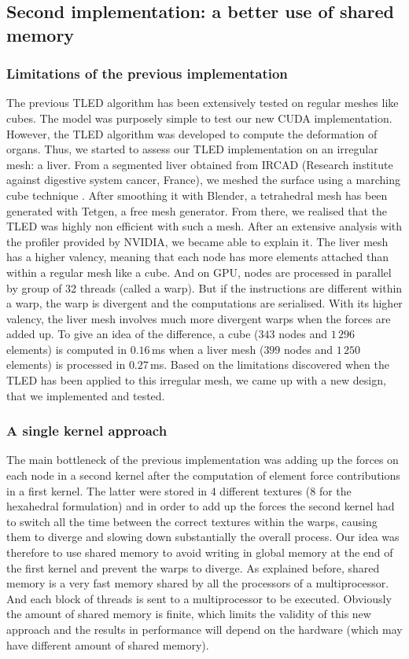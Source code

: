 	\subsection{Second implementation: a better use of shared memory}

\subsubsection*{Limitations of the previous implementation}
The previous TLED algorithm has been extensively tested on regular meshes like cubes. The model was purposely simple to test our new CUDA implementation. However, the TLED algorithm was developed to compute the deformation of organs. Thus, we started to assess our TLED implementation on an irregular mesh: a liver. From a segmented liver obtained from IRCAD (Research institute against digestive system cancer, France), we meshed the surface using a marching cube technique \citep{Lorensen87}. After smoothing it with Blender, a tetrahedral mesh has been generated with Tetgen, a free mesh generator. From there, we realised that the TLED was highly non efficient with such a mesh. After an extensive analysis with the profiler provided by NVIDIA, we became able to explain it. The liver mesh has a higher valency, meaning that each node has more elements attached than within a regular mesh like a cube. And on GPU, nodes are processed in parallel by group of 32 threads (called a warp). But if the instructions are different within a warp, the warp is divergent and the computations are serialised. With its higher valency, the liver mesh involves much more divergent warps when the forces are added up. To give an idea of the difference, a cube ($343$ nodes and $1\,296$ elements) is computed in $0.16\,$ms when a liver mesh ($399$ nodes and $1\,250$ elements) is processed in $0.27\,$ms. Based on the limitations discovered when the TLED has been applied to this irregular mesh, we came up with a new design, that we implemented and tested.

\subsubsection*{A single kernel approach}
The main bottleneck of the previous implementation was adding up the forces on each node in a second kernel after the computation of element force contributions in a first kernel. The latter were stored in 4 different textures (8 for the hexahedral formulation) and in order to add up the forces the second kernel had to switch all the time between the correct textures within the warps, causing them to diverge and slowing down substantially the overall process. Our idea was therefore to use shared memory to avoid writing in global memory at the end of the first kernel and prevent the warps to diverge. As explained before, shared memory is a very fast memory shared by all the processors of a multiprocessor. And each block of threads is sent to a multiprocessor to be executed. Obviously the amount of shared memory is finite, which limits the validity of this new approach and the results in performance will depend on the hardware (which may have different amount of shared memory). 

